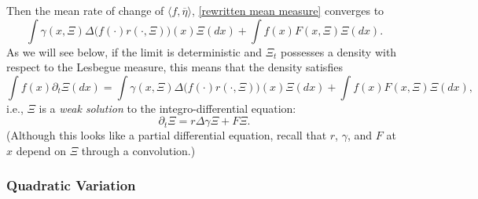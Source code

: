 \documentclass[12pt]{article}
\begin{document}
Then the mean rate of change of $\langle f, \overline{\eta}\rangle$,
\eqref{rewritten mean measure} converges to
\begin{equation} \label{limit of mean measure equation}
    \int \gamma(x,\Xi)
        \Delta \big(f(\cdot)r(\cdot,\Xi)\big)(x)
    \Xi(dx)
    + \int f(x)
        F(x,\Xi)
    \Xi(dx) .
\end{equation}
As we will see below,
if the limit is deterministic and $\Xi_t$ possesses a density
with respect to the Lesbegue measure,
this means that the density satisfies
\begin{equation}
\label{eq: limit of mean measure equation 2}
    \int f(x) \partial_t \Xi(dx)
    =
    \int \gamma(x,\Xi)
        \Delta \big(f(\cdot)r(\cdot,\Xi)\big)(x)
    \Xi(dx)
    + \int f(x)
        F(x,\Xi)
    \Xi(dx),
\end{equation}
i.e., $\Xi$ is a \textit{weak solution} to the integro-differential equation:
\begin{equation}\label{eq:PDE}
    \partial_t \Xi
    = r \Delta \gamma \Xi + F \Xi .
\end{equation}
(Although this looks like a partial differential equation,
recall that $r$, $\gamma$, and $F$ at $x$ depend on $\Xi$
through a convolution.)


\subsubsection*{Quadratic Variation}
\end{document}
